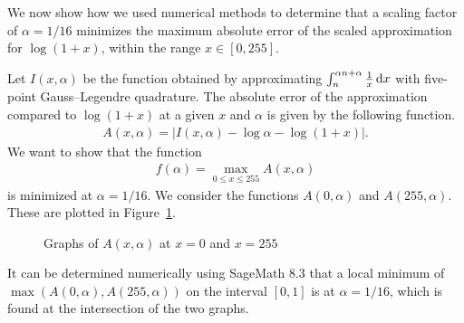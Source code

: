 We now show how we used numerical methods to determine that a scaling factor of $\alpha = 1/16$ minimizes the maximum absolute error of the scaled approximation for $\log{\left(1+x\right)}$, within the range $x \in [0, 255]$.

Let $I\left(x,\alpha\right)$ be the function obtained by approximating $\int_{n}^{\alpha n + \alpha}{\frac{1}{x}\mathop{}\!\mathrm{d} x}$ with five-point Gauss--Legendre quadrature. The absolute error of the approximation compared to $\log{\left(1+x\right)}$ at a given $x$ and $\alpha$ is given by the following function.
\begin{align*}
	A\left(x,\alpha\right) = \left| I\left(x,\alpha\right) - \log\alpha - \log{\left(1+x\right)}\right|.
\end{align*}
We want to show that the function
\begin{align*}
	f\left(\alpha\right) = \max_{0\leq x \leq 255}{A\left(x,\alpha\right)}
\end{align*}
is minimized at $\alpha = 1/16$.
We consider the functions $A\left(0,\alpha\right)$ and $A\left(255,\alpha\right)$. These are plotted in Figure~\ref{fig:endpoint_plot}.
\begin{figure}[!ht]
	\centering
	\caption{Graphs of $A\left(x,\alpha\right)$ at $x=0$ and $x=255$}
	\label{fig:endpoint_plot}
\end{figure}

It can be determined numerically using SageMath 8.3 that a local minimum of $\max\left(A\left(0,\alpha\right),A\left(255,\alpha\right)\right)$ on the interval $[0,1]$ is at $\alpha = 1/16$, which is found at the intersection of the two graphs.

